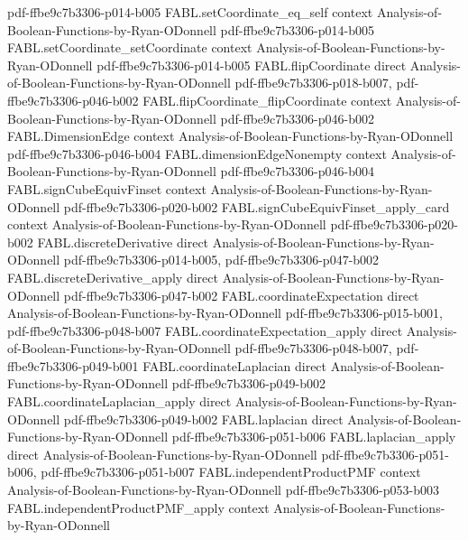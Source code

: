 \begin{theorem}
  {pdf-ffbe9c7b3306-p014-b005}
\proofstep
  {FABL.setCoordinate_eq_self}
  {context}
  {Analysis-of-Boolean-Functions-by-Ryan-ODonnell}
  {pdf-ffbe9c7b3306-p014-b005}
\proofstep
  {FABL.setCoordinate_setCoordinate}
  {context}
  {Analysis-of-Boolean-Functions-by-Ryan-ODonnell}
  {pdf-ffbe9c7b3306-p014-b005}
\proofstep
  {FABL.flipCoordinate}
  {direct}
  {Analysis-of-Boolean-Functions-by-Ryan-ODonnell}
  {pdf-ffbe9c7b3306-p018-b007,
    pdf-ffbe9c7b3306-p046-b002}
\proofstep
  {FABL.flipCoordinate_flipCoordinate}
  {context}
  {Analysis-of-Boolean-Functions-by-Ryan-ODonnell}
  {pdf-ffbe9c7b3306-p046-b002}
\proofstep
  {FABL.DimensionEdge}
  {context}
  {Analysis-of-Boolean-Functions-by-Ryan-ODonnell}
  {pdf-ffbe9c7b3306-p046-b004}
\proofstep
  {FABL.dimensionEdgeNonempty}
  {context}
  {Analysis-of-Boolean-Functions-by-Ryan-ODonnell}
  {pdf-ffbe9c7b3306-p046-b004}
\proofstep
  {FABL.signCubeEquivFinset}
  {context}
  {Analysis-of-Boolean-Functions-by-Ryan-ODonnell}
  {pdf-ffbe9c7b3306-p020-b002}
\proofstep
  {FABL.signCubeEquivFinset_apply_card}
  {context}
  {Analysis-of-Boolean-Functions-by-Ryan-ODonnell}
  {pdf-ffbe9c7b3306-p020-b002}
\proofstep
  {FABL.discreteDerivative}
  {direct}
  {Analysis-of-Boolean-Functions-by-Ryan-ODonnell}
  {pdf-ffbe9c7b3306-p014-b005,
    pdf-ffbe9c7b3306-p047-b002}
\proofstep
  {FABL.discreteDerivative_apply}
  {direct}
  {Analysis-of-Boolean-Functions-by-Ryan-ODonnell}
  {pdf-ffbe9c7b3306-p047-b002}
\proofstep
  {FABL.coordinateExpectation}
  {direct}
  {Analysis-of-Boolean-Functions-by-Ryan-ODonnell}
  {pdf-ffbe9c7b3306-p015-b001,
    pdf-ffbe9c7b3306-p048-b007}
\proofstep
  {FABL.coordinateExpectation_apply}
  {direct}
  {Analysis-of-Boolean-Functions-by-Ryan-ODonnell}
  {pdf-ffbe9c7b3306-p048-b007,
    pdf-ffbe9c7b3306-p049-b001}
\proofstep
  {FABL.coordinateLaplacian}
  {direct}
  {Analysis-of-Boolean-Functions-by-Ryan-ODonnell}
  {pdf-ffbe9c7b3306-p049-b002}
\proofstep
  {FABL.coordinateLaplacian_apply}
  {direct}
  {Analysis-of-Boolean-Functions-by-Ryan-ODonnell}
  {pdf-ffbe9c7b3306-p049-b002}
\proofstep
  {FABL.laplacian}
  {direct}
  {Analysis-of-Boolean-Functions-by-Ryan-ODonnell}
  {pdf-ffbe9c7b3306-p051-b006}
\proofstep
  {FABL.laplacian_apply}
  {direct}
  {Analysis-of-Boolean-Functions-by-Ryan-ODonnell}
  {pdf-ffbe9c7b3306-p051-b006,
    pdf-ffbe9c7b3306-p051-b007}
\proofstep
  {FABL.independentProductPMF}
  {context}
  {Analysis-of-Boolean-Functions-by-Ryan-ODonnell}
  {pdf-ffbe9c7b3306-p053-b003}
\proofstep
  {FABL.independentProductPMF_apply}
  {context}
  {Analysis-of-Boolean-Functions-by-Ryan-ODonnell}

\end{theorem}
